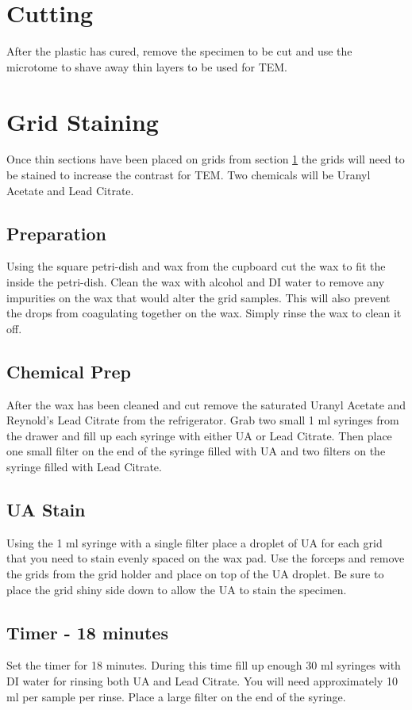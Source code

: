 \section{Cutting}\label{Cutting}
After the plastic has cured, remove the specimen to be cut and use the microtome to shave away thin layers to be used for TEM.  

\section{Grid Staining}
Once thin sections have been placed on grids from section \ref{Cutting} the grids will need to be stained to increase the contrast for TEM.  Two chemicals will be Uranyl Acetate and Lead Citrate.

\subsection{Preparation}
Using the square petri-dish and wax from the cupboard cut the wax to fit the inside the petri-dish.  Clean the wax with alcohol and DI water to remove any impurities on the wax that would alter the grid samples.  This will also prevent the drops from coagulating together on the wax.  Simply rinse the wax to clean it off.

\subsection{Chemical Prep}
After the wax has been cleaned and cut remove the saturated Uranyl Acetate and Reynold's Lead Citrate from the refrigerator.  Grab two small 1 ml syringes from the drawer and fill up each syringe with either UA or Lead Citrate.  Then place one small filter on the end of the syringe filled with UA and two filters on the syringe filled with Lead Citrate.  

\subsection{UA Stain}\label{UA_Stain}
Using the 1 ml syringe with a single filter place a droplet of UA for each grid that you need to stain evenly spaced on the wax pad.  Use the forceps and remove the grids from the grid holder and place on top of the UA droplet.  Be sure to place the grid shiny side down to allow the UA to stain the specimen.

\subsection{Timer - 18 minutes}
Set the timer for 18 minutes.  During this time fill up enough 30 ml syringes with DI water for rinsing both UA and Lead Citrate.  You will need approximately 10 ml per sample per rinse.  Place a large filter on the end of the syringe.

